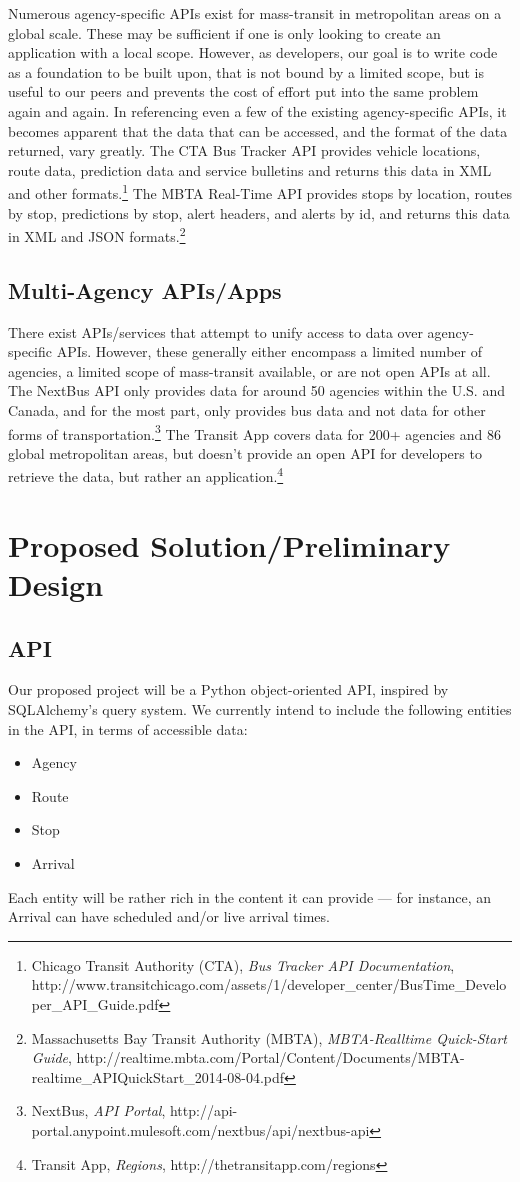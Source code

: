 \documentclass[12pt]{article}
\begin{document}
Numerous agency-specific APIs exist for mass-transit in metropolitan areas on a global scale.
These may be sufficient if one is only looking to create an application with a local scope. However,
as developers, our goal is to write code as a foundation to be built upon, that is not bound by a
limited scope, but is useful to our peers and prevents the cost of effort put into the same 
problem again and again. In referencing even a few of the existing agency-specific APIs, it
becomes apparent that the data that can be accessed, and the format of the data returned, 
vary greatly. The CTA Bus Tracker API provides vehicle locations, route data, prediction data and 
service bulletins and returns this data in XML and other formats.\footnote{Chicago Transit Authority (CTA), \textit{Bus Tracker API Documentation},
http://www.transitchicago.com/assets/1/developer\_center/BusTime\_Developer\_API\_Guide.pdf} The MBTA Real-Time API provides 
stops by location, routes by stop, predictions by stop, alert headers, and alerts by id, and returns 
this data in XML and JSON formats.\footnote{Massachusetts Bay Transit Authority (MBTA), \textit{MBTA-Realltime Quick-Start Guide},
http://realtime.mbta.com/Portal/Content/Documents/MBTA-realtime\_APIQuickStart\_2014-08-04.pdf} 

\subsection{Multi-Agency APIs/Apps}
There exist APIs/services that attempt to unify access to data over agency-specific APIs.
However, these generally either encompass a limited number of agencies, a limited scope
of mass-transit available, or are not open APIs at all. The NextBus API only provides data for
around 50 agencies within the U.S. and Canada, and for the most part, only provides bus data 
and not data for other forms of transportation.\footnote{NextBus, \textit{API Portal}, http://api-portal.anypoint.mulesoft.com/nextbus/api/nextbus-api} The Transit App covers data for 200+ agencies
and 86 global metropolitan areas, but doesn't provide an open API for developers to retrieve the
data, but rather an application.\footnote{Transit App, \textit{Regions}, http://thetransitapp.com/regions}


\section{Proposed Solution/Preliminary Design}
\subsection{API}
Our proposed project will be a Python object-oriented API, inspired by SQLAlchemy's query system.
We currently intend to include the following entities in the API, in terms of accessible data:
\begin{itemize}
\item Agency
\item Route
\item Stop
\item Arrival
\end{itemize}
Each entity will be rather rich in the content it can provide --- for instance, an Arrival can have scheduled
and/or live arrival times.
\end{document}
